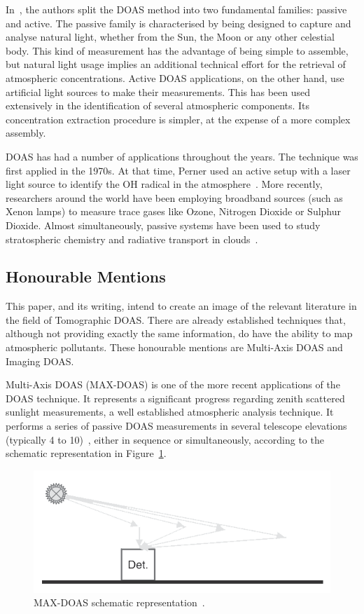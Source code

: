 In~\cite{Platt2007}, the authors split the DOAS method into two
fundamental families: passive and active. The passive family is
characterised by being designed to capture and analyse natural light,
whether from the Sun, the Moon or any other celestial body. This kind of
measurement has the advantage of being simple to assemble, but natural
light usage implies an additional technical effort for the retrieval of
atmospheric concentrations. Active DOAS applications, on the other hand,
use artificial light sources to make their measurements. This has been
used extensively in the identification of several atmospheric
components. Its concentration extraction procedure is simpler, at the
expense of a more complex assembly.

DOAS has had a number of applications throughout the years. The
technique was first applied in the 1970s. At that time, Perner used an
active setup with a laser light source to identify the OH radical in the
atmosphere~\cite{Perner1976}. More recently, researchers around the
world have been employing broadband sources (such as Xenon lamps) to
measure trace gases like Ozone, Nitrogen Dioxide or Sulphur Dioxide.
Almost simultaneously, passive systems have been used to study
stratospheric chemistry and radiative transport in
clouds~\cite{Platt2007}.

\subsection{Honourable Mentions}%
\label{sub:multi_axis_doas}

This paper, and its writing, intend to create an image of the relevant
literature in the field of Tomographic DOAS. There are already
established techniques that, although not providing exactly the same
information, do have the ability to map atmospheric pollutants. These
honourable mentions are Multi-Axis DOAS and Imaging DOAS.

Multi-Axis DOAS (MAX-DOAS) is one of the more recent applications of the
DOAS technique. It represents a significant progress regarding zenith
scattered sunlight measurements, a well established atmospheric analysis
technique. It performs a series of passive DOAS measurements in several
telescope elevations (typically 4 to 10)~\cite{Honninger2004}, either in
sequence or simultaneously, according to the schematic representation in
Figure~\ref{fig:max_doas}. 

\begin{figure}[htpb]
    \centering
    \includegraphics[width=0.8\linewidth]{img/png/maxdoas.png}
    \caption{MAX-DOAS schematic representation~\cite{Platt2007}.}
    \label{fig:max_doas}
\end{figure}

